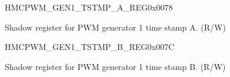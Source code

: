 \begin{register}{H}{MCPWM\_GEN1\_TSTMP\_A\_REG}{0x0078}\label{regdesc:MCPWMGEN1TSTMPAREG}
%
%
\regnewline%
\begin{regdesc}\begin{reglist}
\label{fielddesc:MCPWMGEN1A}\item [MCPWM\_GEN1\_A] Shadow register for PWM generator 1 time stamp A.  (R/W)
\end{reglist}\end{regdesc}
\end{register}


\begin{register}{H}{MCPWM\_GEN1\_TSTMP\_B\_REG}{0x007C}\label{regdesc:MCPWMGEN1TSTMPBREG}
%
%
\regnewline%
\begin{regdesc}\begin{reglist}
\label{fielddesc:MCPWMGEN1B}\item [MCPWM\_GEN1\_B] Shadow register for PWM generator 1 time stamp B. (R/W)
\end{reglist}\end{regdesc}
\end{register}


